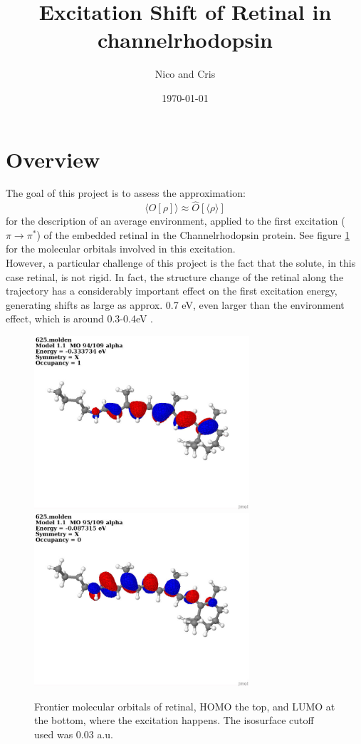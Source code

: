 \documentclass[twoside, 12pt]{article}
\title{\vspace{-1em}\textbf{Excitation Shift of Retinal in channelrhodopsin}}
\author{\normalsize Nico and Cris}
\date{\normalsize \today}
\begin{document}
\maketitle
\section{Overview}

The goal of this project is to assess the approximation:
\begin{equation}
\langle \hat{O}[\rho]\rangle \approx \hat{O}[\langle \rho \rangle]
\end{equation}
for the description of an average environment, applied to the first excitation ($\pi\to\pi^*$) of the embedded retinal in the Channelrhodopsin protein. See figure \ref{fig:mos} for the molecular orbitals involved in this excitation.\\
However, a particular challenge of this project is the fact that the solute, in this case retinal, is not rigid. In fact, the structure change of the retinal along the trajectory has a considerably important effect on the first excitation energy, generating shifts as large as approx. 0.7 eV, even larger than the environment effect, which is around 0.3-0.4eV \cite{Suliman2020}.

\begin{figure}[H]
\centering
\includegraphics[width=8cm]{./figures/625_94.jpg}\includegraphics[width=8cm]{./figures/625_95.jpg}
\caption{Frontier molecular orbitals of retinal, HOMO the top, and LUMO at the bottom, where the excitation happens. The isosurface cutoff used was 0.03 a.u.} 
\label{fig:mos}
\end{figure}
\end{document}
